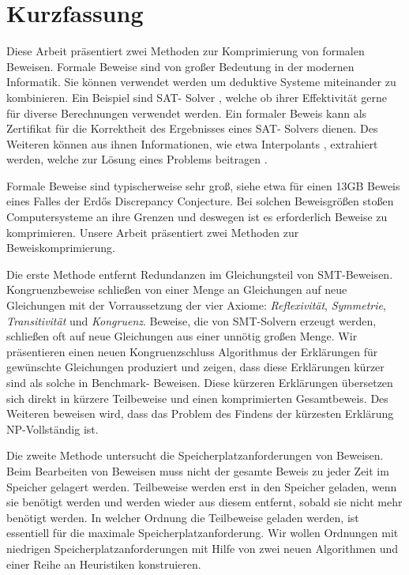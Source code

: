 \chapter*{Kurzfassung}

Diese Arbeit präsentiert zwei Methoden zur Komprimierung von formalen Beweisen.
Formale Beweise sind von gro{\ss}er Bedeutung in der modernen Informatik.
Sie k\"onnen verwendet werden um deduktive Systeme miteinander zu kombinieren. 
Ein Beispiel sind SAT- Solver \cite{Biere2009}, welche ob ihrer Effektivit\"at gerne f\"ur diverse Berechnungen verwendet werden.
Ein formaler Beweis kann als Zertifikat f\"ur die Korrektheit des Ergebnisses eines SAT- Solvers dienen.
Des Weiteren k\"onnen aus ihnen Informationen, wie etwa Interpolants \cite{McMill2005}, extrahiert werden, welche zur L\"osung eines Problems beitragen \cite{Hofferek2013}.

Formale Beweise sind typischerweise sehr gro{\ss}, siehe etwa \cite{Konev2014} f\"ur einen 13GB Beweis eines Falles der Erd\H{o}s Discrepancy Conjecture.
Bei solchen Beweisgr\"o{\ss}en sto{\ss}en Computersysteme an ihre Grenzen und deswegen ist es erforderlich Beweise zu komprimieren.
Unsere Arbeit pr\"asentiert zwei Methoden zur Beweiskomprimierung.

Die erste Methode entfernt Redundanzen im Gleichungsteil von SMT-Beweisen.
Kongruenzbeweise schlie{\ss}en von einer Menge an Gleichungen auf neue Gleichungen mit der Vorraussetzung der vier Axiome: \emph{Reflexivit\"at}, \emph{Symmetrie}, \emph{Transitivit\"at} und \emph{Kongruenz}.
Beweise, die von SMT-Solvern erzeugt werden, schlie{\ss}en oft auf neue Gleichungen aus einer unn\"otig gro{\ss}en Menge.
Wir pr\"asentieren einen neuen Kongruenzschluss Algorithmus der Erkl\"arungen f\"ur gew\"unschte Gleichungen produziert und zeigen, dass diese Erkl\"arungen k\"urzer sind als solche in Benchmark- Beweisen.
Diese k\"urzeren Erkl\"arungen \"ubersetzen sich direkt in k\"urzere Teilbeweise und einen komprimierten Gesamtbeweis.
Des Weiteren beweisen wird, dass das Problem des Findens der k\"urzesten Erkl\"arung NP-Vollst\"andig ist.

Die zweite Methode untersucht die Speicherplatzanforderungen von Beweisen.
Beim Bearbeiten von Beweisen muss nicht der gesamte Beweis zu jeder Zeit im Speicher gelagert werden.
Teilbeweise werden erst in den Speicher geladen, wenn sie ben\"otigt werden und werden wieder aus diesem entfernt, sobald sie nicht mehr ben\"otigt werden.
In welcher Ordnung die Teilbeweise geladen werden, ist essentiell f\"ur die maximale Speicherplatzanforderung.
Wir wollen Ordnungen mit niedrigen Speicherplatzanforderungen mit Hilfe von zwei neuen Algorithmen und einer Reihe an Heuristiken konstruieren.